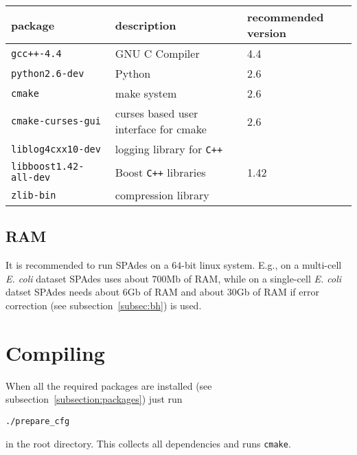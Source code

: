 \documentclass{article}
\def\spades{SPAdes}
\begin{document}
\begin{center}
\begin{tabular}{lll}
\toprule
package & description & recommended version\\
\midrule
{\tt gcc++-4.4} & GNU C Compiler & 4.4\\
{\tt python2.6-dev} & Python & 2.6\\
{\tt cmake} & make system & 2.6\\
{\tt cmake-curses-gui} & curses based user interface for cmake & 2.6\\
{\tt liblog4cxx10-dev} & logging library for {\tt C++} & \\
{\tt libboost1.42-all-dev} & Boost {\tt C++} libraries & 1.42\\
{\tt zlib-bin} & compression library & \\
\bottomrule
\end{tabular}
\end{center}

\subsection{RAM}
It is recommended to run {\spades} on a $64$-bit linux system. %
E.g., on a multi-cell {\it E. coli} dataset {\spades} uses about $700$Mb of RAM,
while on a single-cell {\it E. coli} datset {\spades} needs about $6$Gb of RAM
and about $30$Gb of RAM if error correction (see subsection~\ref{subsec:bh}) is used.

\section{Compiling}
When all the required packages are installed (see 
subsection~\ref{subsection:packages})
just run
\begin{lstlisting}
./prepare_cfg
\end{lstlisting}
in the root directory. 
This collects all dependencies and runs {\tt cmake}.
\end{document}
